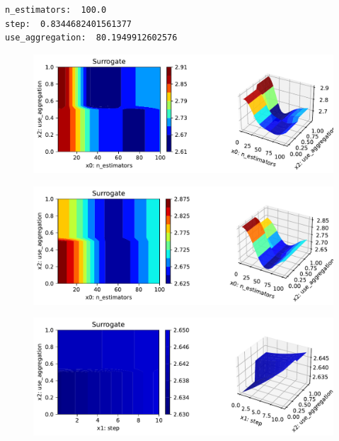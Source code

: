 \documentclass[
  letterpaper,
  DIV=11,
  numbers=noendperiod]{scrreprt}
\begin{document}
\begin{verbatim}
n_estimators:  100.0
step:  0.8344682401561377
use_aggregation:  80.1949912602576
\end{verbatim}

\begin{figure}[H]

{\centering \includegraphics{025_spot_hpt_river_friedman_amfr_files/figure-pdf/cell-37-output-2.pdf}

}

\end{figure}

\begin{figure}[H]

{\centering \includegraphics{025_spot_hpt_river_friedman_amfr_files/figure-pdf/cell-37-output-3.pdf}

}

\end{figure}

\begin{figure}[H]

{\centering \includegraphics{025_spot_hpt_river_friedman_amfr_files/figure-pdf/cell-37-output-4.pdf}

}

\end{figure}
\end{document}
